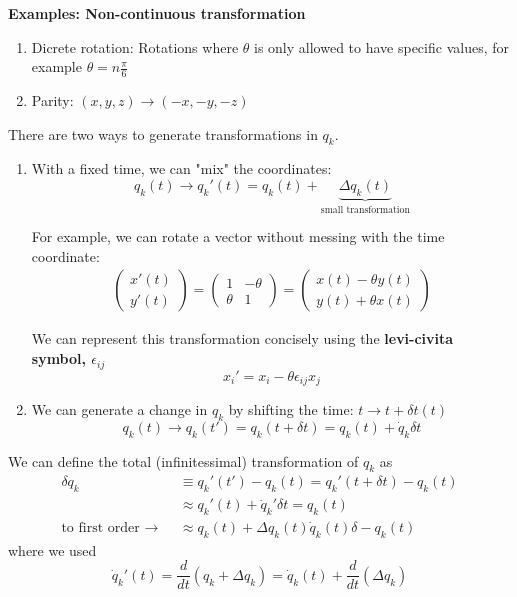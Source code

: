 \documentclass[11pt]{article}
\begin{document}
\begin{redbox}
  \textbf{Examples: Non-continuous transformation}
  \begin{enumerate}
    \item Dicrete rotation: Rotations where $\theta$ is only allowed to have specific values, for example $\theta =  n \frac{\pi}{6}$
    \item Parity: $(x,y,z) \rightarrow (-x,-y,-z)$
  \end{enumerate}
\end{redbox}

\vskip 0.5cm
There are two ways to generate transformations in $q_{k}$. 
\begin{enumerate}
  \item With a fixed time, we can "mix" the coordinates:
  \[ q_{k}(t) \rightarrow q_{k}'(t) = q_{k}(t) + \underbrace{\Delta q_{k}(t) }_{\text{small transformation}} \]

  For example, we can rotate a vector without messing with the time coordinate:
  \begin{align*}
    \begin{pmatrix}
      x'(t) \\
      y'(t)
    \end{pmatrix} = \begin{pmatrix}
      1 & -\theta \\
      \theta & 1
    \end{pmatrix} = \begin{pmatrix}
      x(t) - \theta y(t) \\
      y(t) + \theta x(t) 
    \end{pmatrix}
  \end{align*}

  We can represent this transformation concisely using the \textbf{levi-civita symbol, $\epsilon_{ij}$}
  \[ \boxed{x_i' = x_i - \theta \epsilon_{ij}x_j } \]

  \vskip 0.5cm
  \item We can generate a change in $q_{k}$ by shifting the time: $t \rightarrow t + \delta t(t)$
  \[ q_{k}(t) \rightarrow q_{k}(t') = q_{k}(t + \delta t) = q_{k}(t) + \dot{q}_{k} \delta t \]
\end{enumerate}

\vskip 0.5cm
We can define the total (infinitessimal) transformation of $q_{k}$ as 
\begin{align*}
  \delta q_{k} &\equiv q_{k}'(t') - q_{k}(t) = q_{k}'(t + \delta t) - q_{k}(t) \\
  &\approx q_{k}'(t) + \dot{q}_{k}' \delta t = q_{k}(t) \\
  \text{to first order $\rightarrow$  } &\approx q_{k}(t) + \Delta q_{k}(t)\dot{q}_{k}(t) \delta - q_{k}(t)
\end{align*}
where we used 
\[ \dot{q}_{k}'(t) = \frac{d}{dt} \left( q_{k} + \Delta q_{k} \right) = \dot{q}_{k}(t) + \frac{d}{dt} \left(\Delta q_{k}\right) \]
\end{document}
